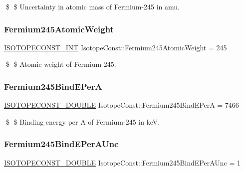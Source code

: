 \$ \$ Uncertainty in atomic mass of Fermium-\/245 in amu. \mbox{\label{group___isotope_const-_fermium-_fm245_gae9d2382798d63b1b089557fd4b846007}} 
\subsubsection{\texorpdfstring{Fermium245\+Atomic\+Weight}{Fermium245AtomicWeight}}
{\footnotesize\ttfamily \mbox{\hyperlink{group___isotope_const-_macros_ga5f18360b3e99483a35c32d789e62621c}{I\+S\+O\+T\+O\+P\+E\+C\+O\+N\+S\+T\+\_\+\+I\+NT}} Isotope\+Const\+::\+Fermium245\+Atomic\+Weight = 245}

\$ \$ Atomic weight of Fermium-\/245. \mbox{\label{group___isotope_const-_fermium-_fm245_ga8fd5c51a0cda862d13231865851d6bca}} 
\subsubsection{\texorpdfstring{Fermium245\+Bind\+E\+PerA}{Fermium245BindEPerA}}
{\footnotesize\ttfamily \mbox{\hyperlink{group___isotope_const-_macros_ga8f45a7272ce02c0b4c65c44636ed719a}{I\+S\+O\+T\+O\+P\+E\+C\+O\+N\+S\+T\+\_\+\+D\+O\+U\+B\+LE}} Isotope\+Const\+::\+Fermium245\+Bind\+E\+PerA = 7466}

\$ \$ Binding energy per A of Fermium-\/245 in keV. \mbox{\label{group___isotope_const-_fermium-_fm245_gaab1c8fdcaa38eebfa46b3f15691a3660}} 
\subsubsection{\texorpdfstring{Fermium245\+Bind\+E\+Per\+A\+Unc}{Fermium245BindEPerAUnc}}
{\footnotesize\ttfamily \mbox{\hyperlink{group___isotope_const-_macros_ga8f45a7272ce02c0b4c65c44636ed719a}{I\+S\+O\+T\+O\+P\+E\+C\+O\+N\+S\+T\+\_\+\+D\+O\+U\+B\+LE}} Isotope\+Const\+::\+Fermium245\+Bind\+E\+Per\+A\+Unc = 1}

